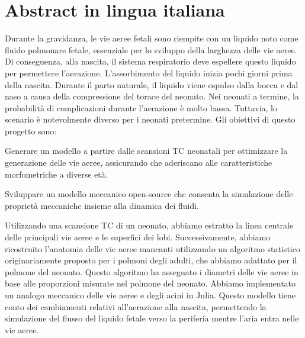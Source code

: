 \section*{Abstract in lingua italiana}
Durante la gravidanza, le vie aeree fetali sono riempite con un
liquido noto come fluido polmonare fetale, essenziale per lo sviluppo
della larghezza delle vie aeree. Di conseguenza, alla nascita, il
sistema respiratorio deve espellere questo liquido per permettere
l'aerazione. L'assorbimento del liquido inizia pochi giorni prima
della nascita. Durante il parto naturale, il liquido viene espulso
dalla bocca e dal naso a causa della compressione del torace del
neonato. Nei neonati a termine, la probabilità di complicazioni
durante l'aerazione è molto bassa. Tuttavia, lo scenario è
notevolmente diverso per i neonati pretermine.
Gli obiettivi di questo progetto sono:
\begin{description}
\item Generare un modello a partire dalle scansioni TC neonatali per
  ottimizzare la generazione delle vie aeree, assicurando che
  aderiscano alle caratteristiche morfometriche a diverse età.
\item Sviluppare un modello meccanico open-source che consenta la
  simulazione delle proprietà meccaniche insieme alla dinamica dei
  fluidi.
\end{description}
Utilizzando una scansione TC di un neonato, abbiamo estratto la linea
centrale delle principali vie aeree e le superfici dei
lobi. Successivamente, abbiamo ricostruito l'anatomia delle vie aeree
mancanti utilizzando un algoritmo statistico originariamente proposto
per i polmoni degli adulti, che abbiamo adattato per il polmone del
neonato. Questo algoritmo ha assegnato i diametri delle vie aeree in
base alle proporzioni misurate nel polmone del neonato. Abbiamo
implementato un analogo meccanico delle vie aeree e degli acini in
Julia. Questo modello tiene conto dei cambiamenti relativi
all'aerazione alla nascita, permettendo la simulazione del flusso del
liquido fetale verso la periferia mentre l'aria entra nelle vie aeree.


